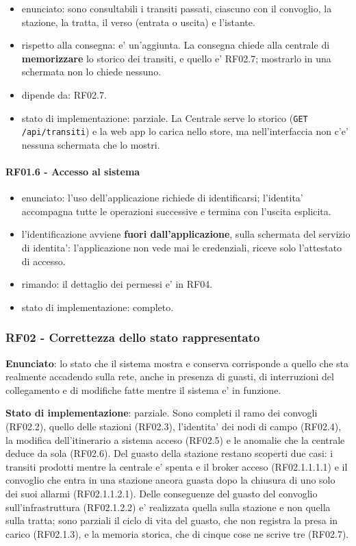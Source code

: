 \documentclass[11pt]{article}
\begin{document}
\begin{itemize}
\item enunciato: sono consultabili i transiti passati, ciascuno con il convoglio, la stazione, la tratta,
il verso (entrata o uscita) e l'istante.
\item rispetto alla consegna: e' un'aggiunta. La consegna chiede alla centrale di \textbf{memorizzare} lo
storico dei transiti, e quello e' RF02.7; mostrarlo in una schermata non lo chiede nessuno.
\item dipende da: RF02.7.
\item stato di implementazione: parziale. La Centrale serve lo storico (\texttt{GET /api/transiti}) e la web
app lo carica nello store, ma nell'interfaccia non c'e' nessuna schermata che lo mostri.
\end{itemize}
\paragraph{RF01.6 - Accesso al sistema}
\label{sec:org9739aed}

\begin{itemize}
\item enunciato: l'uso dell'applicazione richiede di identificarsi; l'identita' accompagna tutte le
operazioni successive e termina con l'uscita esplicita.
\item l'identificazione avviene \textbf{fuori dall'applicazione}, sulla schermata del servizio di identita':
l'applicazione non vede mai le credenziali, riceve solo l'attestato di accesso.
\item rimando: il dettaglio dei permessi e' in RF04.
\item stato di implementazione: completo.
\end{itemize}
\subsubsection{RF02 - Correttezza dello stato rappresentato}
\label{sec:org9aa78b7}
\textbf{Enunciato}: lo stato che il sistema mostra e conserva corrisponde a quello che sta realmente
accadendo sulla rete, anche in presenza di guasti, di interruzioni del collegamento e di modifiche
fatte mentre il sistema e' in funzione.

\textbf{Stato di implementazione}: parziale. Sono completi il ramo dei convogli (RF02.2), quello delle
stazioni (RF02.3), l'identita' dei nodi di campo (RF02.4), la modifica dell'itinerario a sistema
acceso (RF02.5) e le anomalie che la centrale deduce da sola (RF02.6). Del guasto della stazione
restano scoperti due casi: i transiti prodotti mentre la centrale e' spenta e il broker acceso
(RF02.1.1.1.1) e il convoglio che entra in una stazione ancora guasta dopo la chiusura di uno solo
dei suoi allarmi (RF02.1.1.2.1). Delle conseguenze del guasto del convoglio sull'infrastruttura
(RF02.1.2.2) e' realizzata quella sulla stazione e non quella sulla tratta; sono parziali il ciclo
di vita del guasto, che non registra la presa in carico (RF02.1.3), e la memoria storica, che di
cinque cose ne scrive tre (RF02.7).
\end{document}

